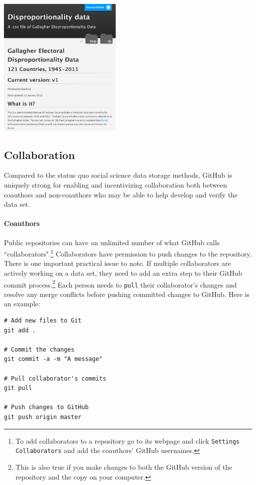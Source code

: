 \documentclass[twocolumn]{article}\usepackage{graphicx, color}
\makeatletter
\newenvironment{kframe}{%
 \def\at@end@of@kframe{}%
 \ifinner\ifhmode%
  \def\at@end@of@kframe{\end{minipage}}%
  \begin{minipage}{\columnwidth}%
 \fi\fi%
 \def\FrameCommand##1{\hskip\@totalleftmargin \hskip-\fboxsep
 \colorbox{shadecolor}{##1}\hskip-\fboxsep
     \hskip-\linewidth \hskip-\@totalleftmargin \hskip\columnwidth}%
 \MakeFramed {\advance\hsize-\width
   \@totalleftmargin\z@ \linewidth\hsize
   \@setminipage}}%
 {\par\unskip\endMakeFramed%
 \at@end@of@kframe}
\newenvironment{knitrout}{}{} %
\makeatother
\begin{document}
\begin{center}
	\includegraphics[width=0.45\textwidth]{images/Pages.png}
\end{center}

\subsection{Collaboration}

Compared to the status quo social science data storage methods, GitHub is uniquely strong for enabling and incentivizing collaboration both between coauthors and non-coauthors who may be able to help develop and verify the data set.  

\paragraph{Coauthors}

Public repositories can have an unlimited number of what GitHub calls ``collaborators".\footnote{To add collaborators to a repository go to its webpage and click \texttt{Settings} \textrightarrow \texttt{Collaborators} and add the coauthors' GitHub usernames.} Collaborators have permission to push changes to the repository. There is one important practical issue to note. If multiple collaborators are actively working on a data set, they need to add an extra step to their GitHub commit process.\footnote{This is also true if you make changes to both the GitHub version of the repository and the copy on your computer.} Each person needs to \texttt{pull} their collaborator's changes and resolve any merge conflicts before pushing committed changes to GitHub. Here is an example:

\begin{knitrout}
\color{fgcolor}\begin{kframe}
\begin{verbatim}
# Add new files to Git
git add .

# Commit the changes
git commit -a -m "A message"

# Pull collaborator's commits
git pull

# Push changes to GitHub
git push origin master
\end{verbatim}
\end{kframe}
\end{knitrout}
\end{document}
